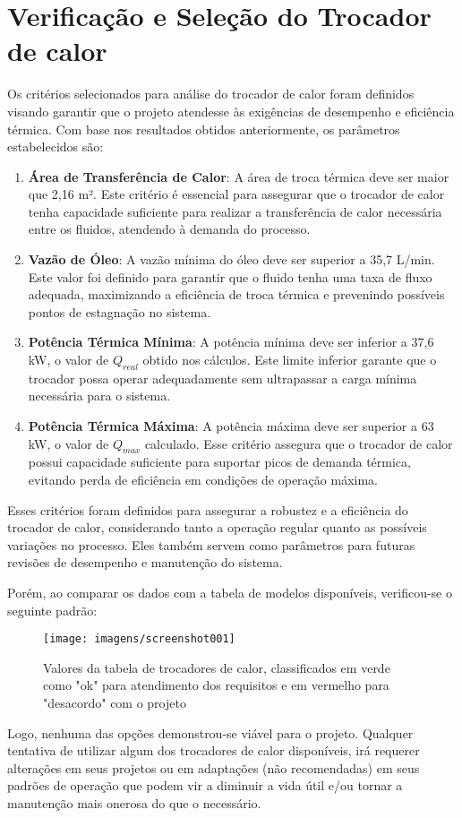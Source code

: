 \section{Verificação e Seleção do Trocador de calor}

Os critérios selecionados para análise do trocador de calor foram definidos visando garantir que o projeto atendesse às exigências de desempenho e eficiência térmica. Com base nos resultados obtidos anteriormente, os parâmetros estabelecidos são:

\begin{enumerate}
	\item \textbf{Área de Transferência de Calor}: A área de troca térmica deve ser maior que 2,16 m². Este critério é essencial para assegurar que o trocador de calor tenha capacidade suficiente para realizar a transferência de calor necessária entre os fluidos, atendendo à demanda do processo.
	
	\item \textbf{Vazão de Óleo}: A vazão mínima do óleo deve ser superior a 35,7 L/min. Este valor foi definido para garantir que o fluido tenha uma taxa de fluxo adequada, maximizando a eficiência de troca térmica e prevenindo possíveis pontos de estagnação no sistema.
	
	\item \textbf{Potência Térmica Mínima}: A potência mínima deve ser inferior a 37,6 kW, o valor de \( Q_{real} \) obtido nos cálculos. Este limite inferior garante que o trocador possa operar adequadamente sem ultrapassar a carga mínima necessária para o sistema.
	
	\item \textbf{Potência Térmica Máxima}: A potência máxima deve ser superior a 63 kW, o valor de \( Q_{max} \) calculado. Esse critério assegura que o trocador de calor possui capacidade suficiente para suportar picos de demanda térmica, evitando perda de eficiência em condições de operação máxima.
\end{enumerate}

Esses critérios foram definidos para assegurar a robustez e a eficiência do trocador de calor, considerando tanto a operação regular quanto as possíveis variações no processo. Eles também servem como parâmetros para futuras revisões de desempenho e manutenção do sistema.

Porém, ao comparar os dados com a tabela de modelos disponíveis, verificou-se o seguinte padrão:

\begin{figure}[h]
	\centering
	\caption{Valores da tabela de trocadores de calor, classificados em verde como "ok" para atendimento dos requisitos e em vermelho para "desacordo" com o projeto}
	\label{fig:screenshot001}
	\texttt{[image: imagens/screenshot001]}
	
\end{figure}

Logo, nenhuma das opções demonstrou-se viável para o projeto. Qualquer tentativa de utilizar algum dos trocadores de calor disponíveis, irá requerer alterações em seus projetos ou em adaptações (não recomendadas) em seus padrões de operação que podem vir a diminuir a vida útil e/ou tornar a manutenção mais onerosa do que o necessário.
